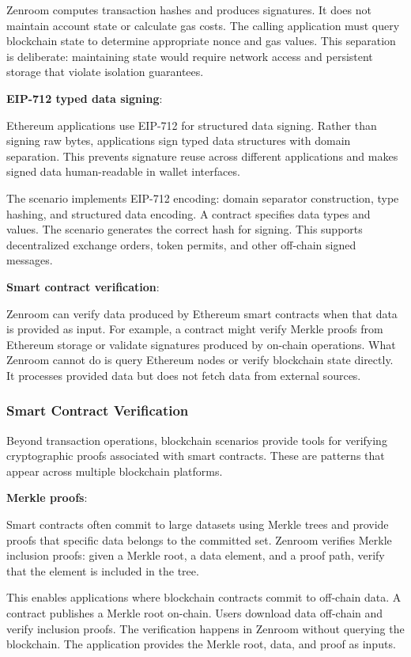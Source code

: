 Zenroom computes transaction hashes and produces signatures. It does
not maintain account state or calculate gas costs. The calling
application must query blockchain state to determine appropriate nonce
and gas values. This separation is deliberate: maintaining state would
require network access and persistent storage that violate isolation
guarantees.

\textbf{EIP-712 typed data signing}:

Ethereum applications use EIP-712 for structured data signing. Rather
than signing raw bytes, applications sign typed data structures with
domain separation. This prevents signature reuse across different
applications and makes signed data human-readable in wallet
interfaces.

The scenario implements EIP-712 encoding: domain separator
construction, type hashing, and structured data encoding. A contract
specifies data types and values. The scenario generates the correct
hash for signing. This supports decentralized exchange orders, token
permits, and other off-chain signed messages.

\textbf{Smart contract verification}:

Zenroom can verify data produced by Ethereum smart contracts when that
data is provided as input. For example, a contract might verify Merkle
proofs from Ethereum storage or validate signatures produced by
on-chain operations. What Zenroom cannot do is query Ethereum nodes or
verify blockchain state directly. It processes provided data but does
not fetch data from external sources.

\subsubsection{Smart Contract Verification}

Beyond transaction operations, blockchain scenarios provide tools for
verifying cryptographic proofs associated with smart contracts. These
are patterns that appear across multiple blockchain platforms.

\textbf{Merkle proofs}:

Smart contracts often commit to large datasets using Merkle trees and
provide proofs that specific data belongs to the committed
set. Zenroom verifies Merkle inclusion proofs: given a Merkle root, a
data element, and a proof path, verify that the element is included in
the tree.

This enables applications where blockchain contracts commit to
off-chain data. A contract publishes a Merkle root on-chain. Users
download data off-chain and verify inclusion proofs. The verification
happens in Zenroom without querying the blockchain. The application
provides the Merkle root, data, and proof as inputs.

